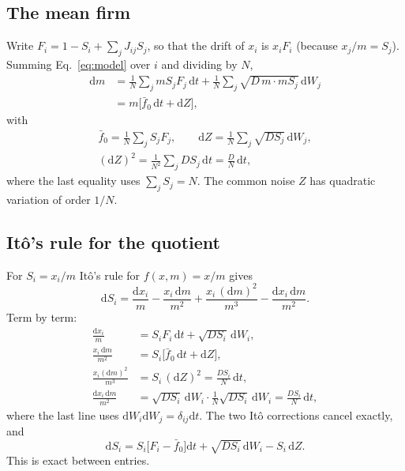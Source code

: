 \documentclass[pre,twocolumn,superscriptaddress,nofootinbib]{revtex4-2}
\newcommand{\fb}{\bar f}
\newcommand{\dd}{\mathrm d}
\begin{document}
\subsection{The mean firm}

Write $F_i=1-S_i+\sum_jJ_{ij}S_j$, so that the drift of $x_i$ is $x_iF_i$ (because $x_j/m=S_j$).  Summing
Eq.~\eqref{eq:model} over $i$ and dividing by $N$,
\begin{equation}
\begin{split}
\dd m&=\frac1N\sum_jmS_jF_j\,\dd t+\frac1N\sum_j\sqrt{D\,m\cdot mS_j}\,\dd W_j\\
&=m\big[\fb_0\,\dd t+\dd Z\big],
\end{split}
\label{eq:app-dm}
\end{equation}
with
\begin{equation}
\begin{gathered}
\fb_0=\frac1N\sum_jS_jF_j,\qquad \dd Z=\frac1N\sum_j\sqrt{DS_j}\,\dd W_j,\\
(\dd Z)^2=\frac{1}{N^2}\sum_jDS_j\,\dd t=\frac DN\,\dd t ,
\end{gathered}
\label{eq:app-Z}
\end{equation}
where the last equality uses $\sum_jS_j=N$.  The common noise $Z$ has quadratic variation of order
$1/N$.

\subsection{It\^o's rule for the quotient}

For $S_i=x_i/m$ It\^o's rule for $f(x,m)=x/m$ gives
\begin{equation}
\dd S_i=\frac{\dd x_i}{m}-\frac{x_i\,\dd m}{m^2}+\frac{x_i\,(\dd m)^2}{m^3}-\frac{\dd x_i\,\dd m}{m^2}.
\end{equation}
Term by term:
\begin{align}
\frac{\dd x_i}{m}&=S_iF_i\,\dd t+\sqrt{DS_i}\,\dd W_i,\\
\frac{x_i\,\dd m}{m^2}&=S_i\big[\fb_0\,\dd t+\dd Z\big],\\
\frac{x_i(\dd m)^2}{m^3}&=S_i\,(\dd Z)^2=\frac{DS_i}{N}\,\dd t,\\
\frac{\dd x_i\,\dd m}{m^2}&=\sqrt{DS_i}\,\dd W_i\cdot\frac1N\sqrt{DS_i}\,\dd W_i=\frac{DS_i}{N}\,\dd t ,
\end{align}
where the last line uses $\dd W_i\dd W_j=\delta_{ij}\dd t$.  The two It\^o corrections cancel exactly, and
\begin{equation}
\boxed{\dd S_i=S_i\big[F_i-\fb_0\big]\dd t+\sqrt{DS_i}\,\dd W_i-S_i\,\dd Z .}
\label{eq:app-rel}
\end{equation}
This is exact between entries.
\end{document}
